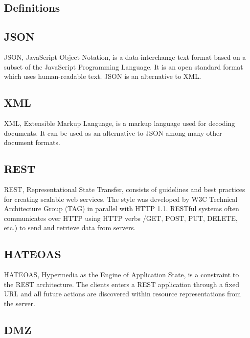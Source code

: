 \documentclass{cslthse-msc}
\begin{document}
\begin{appendices}
\chapter{Definitions}
\section{JSON}
JSON, JavaScript Object Notation, is a data-interchange text format based on a subset of the JavaScript Programming Language. It is an open standard format which uses human-readable text. JSON is an alternative to XML.

\section{XML}
XML, Extensible Markup Language, is a markup language used for decoding documents. It can be used as an alternative to JSON among many other document formats.

\section{REST}
REST, Representational State Transfer, consists of guidelines and best practices for creating scalable web services. The style was developed by W3C Technical Architecture Group (TAG) in parallel with HTTP 1.1. RESTful systems often communicates over HTTP using HTTP verbs /GET, POST, PUT, DELETE, etc.) to send and retrieve data from servers.

\section{HATEOAS}
HATEOAS, Hypermedia as the Engine of Application State, is a constraint to the REST architecture. The clients enters a REST application through a fixed URL and all future actions are discovered within resource representations from the server.

\section{DMZ}

\end{appendices}

\end{document}
